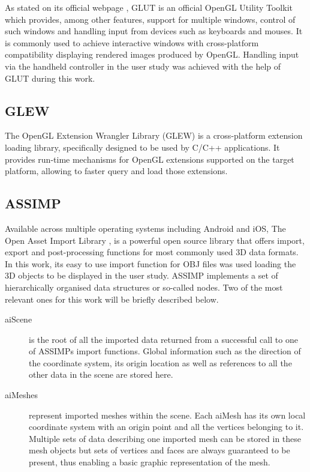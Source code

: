 As stated on its official webpage \cite{GLUT}, GLUT is an official OpenGL Utility Toolkit which provides, among other features, support for multiple windows, control of such windows and handling input from devices such as keyboards and mouses. It is commonly used to achieve interactive windows with cross-platform compatibility displaying rendered images produced by OpenGL. Handling input via the handheld controller in the user study was achieved with the help of GLUT during this work.

\subsection{GLEW}
\label{sec:glew}

The OpenGL Extension Wrangler Library (GLEW)\cite{GLEW} is a cross-platform extension loading library, specifically designed to be used by C/C++ applications. It provides run-time mechanisms for OpenGL extensions supported on the target platform, allowing to faster query and load those extensions.

\subsection{ASSIMP}
\label{sec:assimp}

Available across multiple operating systems including Android and iOS, The Open Asset Import Library \cite{ASP}, is a powerful open source library that offers import, export and post-processing functions for most commonly used 3D data formats. In this work, its easy to use import function for OBJ files was used loading the 3D objects to be displayed in the user study. ASSIMP implements a set of hierarchically organised data structures or so-called nodes. Two of the most relevant ones for this work will be briefly described below.

\begin{description}
	\item[aiScene] is the root of all the imported data returned from a successful call to one of ASSIMPs import functions. Global information such as the direction of the coordinate system, its origin location as well as references to all the other data in the scene are stored here.
	\item[aiMeshes] represent imported meshes within the scene. Each aiMesh has its own local coordinate system with an origin point and all the vertices belonging to it. Multiple sets of data describing one imported mesh can be stored in these mesh objects but sets of vertices and faces are always guaranteed to be present, thus enabling a basic graphic representation of the mesh.
\end{description}


